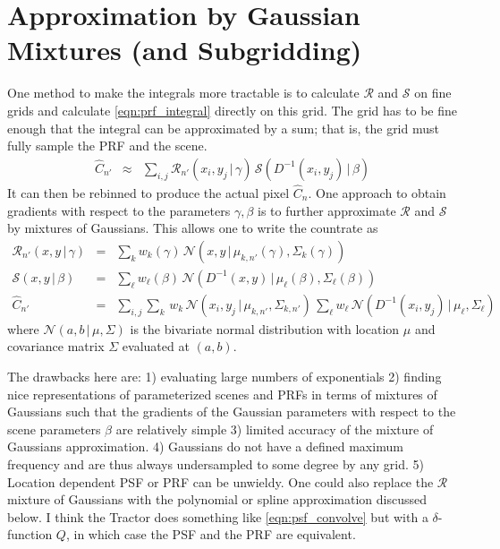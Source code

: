 \documentclass[modern]{aastex6}
\newcommand{\given}{\,|\,}
\newcommand{\countrate}{\hat{C}}
\newcommand{\prf}{\mathcal{R}}
\newcommand{\qe}{Q}
\newcommand{\scene}{\mathcal{S}}
\newcommand{\normal}{\mathcal{N}}
\begin{document}
\section{Approximation by Gaussian Mixtures (and Subgridding)}
One method to make the integrals more tractable is to calculate $\prf$ and $\scene$ on fine grids and calculate \ref{eqn:prf_integral} directly on this grid.
The grid has to be fine enough that the integral can be approximated by a sum; 
  that is, the grid must fully sample the PRF and the scene.
\begin{eqnarray}
\label{eqn:prf_grid}
\countrate_{n'} & \approx & \sum_{i,j} \prf_{n'}(x_i, y_j \given \gamma) \, \scene( D^{-1}(x_i, y_j) \given \beta) \nonumber
\end{eqnarray}
It can then be rebinned to produce the actual pixel $\countrate_n$.
One approach to obtain gradients with respect to the parameters $\gamma, \beta$ is to further approximate $\prf$ and $\scene$ by mixtures of Gaussians.
This allows one to write the countrate as 
\begin{eqnarray}
\prf_{n'}(x, y \given \gamma)  & = & \sum_k w_k(\gamma) \, \normal(x, y \given \mu_{k, n'}(\gamma), \Sigma_k(\gamma)) \\
\scene(x, y \given \beta) & = & \sum_\ell w_\ell(\beta) \, \normal(D^{-1}(x, y) \given \mu_\ell(\beta), \Sigma_\ell(\beta)) \nonumber \\
\countrate_{n'} & = & \sum_{i,j}\sum_{k} \, w_k \, \normal(x_i, y_j \given \mu_{k, n'}, \Sigma_{k, n'}) \, \sum_\ell w_\ell \, \normal(D^{-1}(x_i, y_j) \given \mu_{\ell}, \Sigma_{\ell}) \nonumber
\end{eqnarray}
where $\normal(a, b \given \mu, \Sigma)$ is the bivariate normal distribution with location $\mu$ and covariance matrix $\Sigma$ evaluated at $(a, b)$.


The drawbacks here are:
   1) evaluating large numbers of exponentials
   2) finding nice representations of parameterized scenes and PRFs in terms of mixtures of Gaussians such that the gradients of the Gaussian parameters with respect to the scene parameters $\beta$ are relatively simple
   3) limited accuracy of the mixture of Gaussians approximation.
   4) Gaussians do not have a defined maximum frequency and are thus always undersampled to some degree by any grid.
   5) Location dependent PSF or PRF can be unwieldy.
One could also replace the $\prf$ mixture of Gaussians with the polynomial or spline approximation discussed below.
I think the Tractor does something like \ref{eqn:psf_convolve} but with a $\delta$-function $\qe$, in which case the PSF and the PRF are equivalent.
\end{document}
